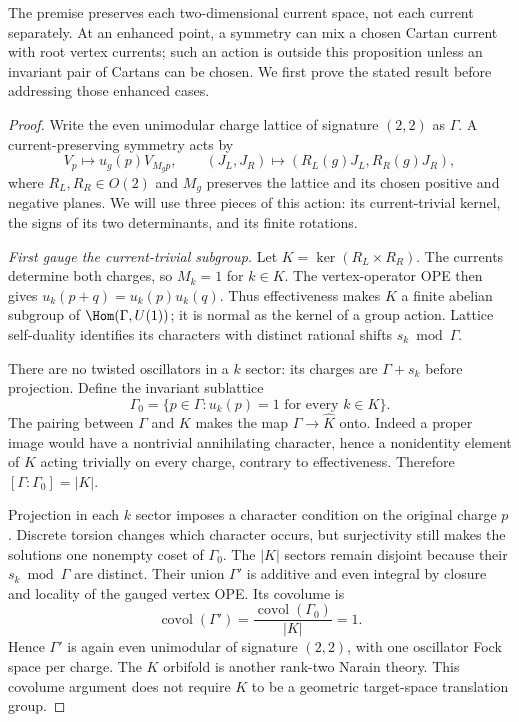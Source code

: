 The premise preserves each two-dimensional current space, not
each current separately. At an enhanced point, a symmetry can mix
a chosen Cartan current with root vertex currents; such an action
is outside this proposition unless an invariant pair of Cartans
can be chosen. We first prove the stated result before addressing
those enhanced cases.

\begin{proof}
Write the even unimodular charge lattice of signature $(2,2)$ as
$\Gamma$. A current-preserving symmetry acts by
\[
 V_p\longmapsto u_g(p)V_{M_gp},\qquad
 (J_L,J_R)\longmapsto(R_L(g)J_L,R_R(g)J_R),
\]
where $R_L,R_R\in O(2)$ and $M_g$ preserves the lattice and
its chosen positive and negative planes. We will use three
pieces of this action: its current-trivial kernel, the signs of
its two determinants, and its finite rotations.

\emph{First gauge the current-trivial subgroup.}
Let $K=\ker(R_L\times R_R)$. The currents determine both
charges, so $M_k=1$ for $k\in K$. The vertex-operator OPE
then gives $u_k(p+q)=u_k(p)u_k(q)$. Thus effectiveness makes
$K$ a finite abelian subgroup of $\Hom(\Gamma,U(1))$; it is
normal as the kernel of a group action. Lattice self-duality
identifies its characters with distinct rational shifts
$s_k\bmod\Gamma$.

There are no twisted oscillators in a $k$ sector: its charges
are $\Gamma+s_k$ before projection. Define the invariant
sublattice
\[
 \Gamma_0=\{p\in\Gamma:u_k(p)=1\text{ for every }k\in K\}.
\]
The pairing between $\Gamma$ and $K$ makes the map
$\Gamma\to\widehat K$ onto. Indeed a proper image would
have a nontrivial annihilating character, hence a nonidentity
element of $K$ acting trivially on every charge, contrary to
effectiveness. Therefore $[\Gamma:\Gamma_0]=|K|$.

Projection in each $k$ sector imposes a character condition on
the original charge $p$. Discrete torsion changes which character
occurs, but surjectivity still makes the solutions one nonempty
coset of $\Gamma_0$. The $|K|$ sectors remain disjoint because
their $s_k\bmod\Gamma$ are distinct. Their union $\Gamma'$
is additive and even integral by closure and locality of the
gauged vertex OPE. Its covolume is
\[
 \operatorname{covol}(\Gamma')
 =\frac{\operatorname{covol}(\Gamma_0)}{|K|}=1.
\]
Hence $\Gamma'$ is again even unimodular of signature $(2,2)$,
with one oscillator Fock space per charge. The $K$ orbifold is
another rank-two Narain theory. This covolume argument does not
require $K$ to be a geometric target-space translation group.


\end{proof}
